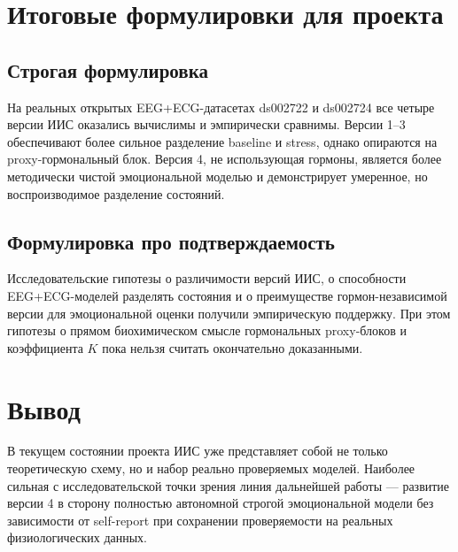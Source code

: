 \documentclass[12pt,a4paper]{article}
\begin{document}
\section{Итоговые формулировки для проекта}
\subsection{Строгая формулировка}
На реальных открытых EEG+ECG-датасетах ds002722 и ds002724 все четыре версии ИИС оказались вычислимы и эмпирически сравнимы. Версии 1--3 обеспечивают более сильное разделение baseline и stress, однако опираются на proxy-гормональный блок. Версия 4, не использующая гормоны, является более методически чистой эмоциональной моделью и демонстрирует умеренное, но воспроизводимое разделение состояний.

\subsection{Формулировка про подтверждаемость}
Исследовательские гипотезы о различимости версий ИИС, о способности EEG+ECG-моделей разделять состояния и о преимуществе гормон-независимой версии для эмоциональной оценки получили эмпирическую поддержку. При этом гипотезы о прямом биохимическом смысле гормональных proxy-блоков и коэффициента $K$ пока нельзя считать окончательно доказанными.

\section{Вывод}
В текущем состоянии проекта ИИС уже представляет собой не только теоретическую схему, но и набор реально проверяемых моделей. Наиболее сильная с исследовательской точки зрения линия дальнейшей работы --- развитие версии 4 в сторону полностью автономной строгой эмоциональной модели без зависимости от self-report при сохранении проверяемости на реальных физиологических данных.
\end{document}
